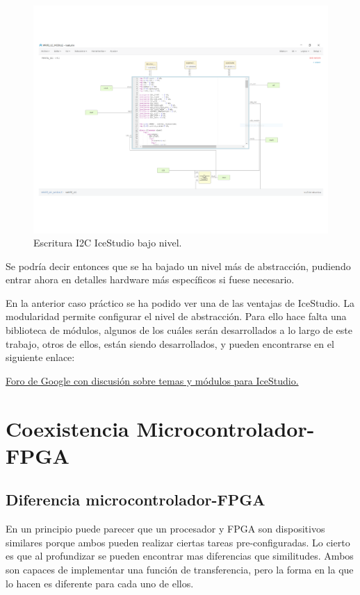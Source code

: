\begin{figure}[H]
	\center
	\includegraphics[trim = 0mm 20mm 0mm 0mm, clip,scale=0.6]{imagenes/EstadoArte/Write_i2c_module2.pdf}
	\caption{Escritura I2C IceStudio bajo nivel.}
	\label{fig:Write_i2c_module2}
\end{figure}

Se podría decir entonces que se ha bajado un nivel más de abstracción, pudiendo entrar ahora en detalles hardware más específicos si fuese necesario. \newline

En la anterior caso práctico se ha podido ver una de las ventajas de IceStudio. La modularidad permite configurar el nivel de abstracción.
Para ello hace falta una biblioteca de módulos, algunos de los cuáles serán desarrollados a lo largo de este trabajo, otros de ellos, están siendo desarrollados, y pueden encontrarse en el siguiente enlace: 

\href{https://groups.google.com/forum/#!topic/fpga-wars-explorando-el-lado-libre/I3ZnqKlfh5M}{Foro de Google con discusión sobre temas y módulos para IceStudio.}


\section{Coexistencia Microcontrolador-FPGA}\label{sec:coexistencia}
\subsection{Diferencia microcontrolador-FPGA}
En un principio puede parecer que un procesador y FPGA son dispositivos similares porque ambos pueden realizar ciertas tareas pre-configuradas. Lo cierto es que al profundizar se pueden encontrar mas diferencias que similitudes. Ambos son capaces de implementar una función de transferencia, pero la forma en la que lo hacen es diferente para cada uno de ellos.\newline

